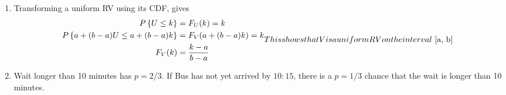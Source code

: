 \begin{enumerate}
\begin{subequations}
\begin{enumerate}
			Applying the above result to the expected value calculation,
			
			\begin{align}
				\mathbb{E}[X] &= \sum\limits_{k = 1}^{\infty} k \ (1-p)^{k-1}\ p \nonumber \\
				&= p\ \left[1 + 2(1-p) + 3(1-p)^2 + 4(1-p)^3 + \dots\right]		\nonumber \\
				&= p \left[\frac{1}{p} + \frac{1-p}{p^2}\right]	= \frac{1}{p} \\
			\end{align}
				
			\item $ Y $ is a negative binomial RV. Only $ r-1 $ out of the first $ k-1 $ trials can be success.
			\begin{align}
				P \left\{Y = k\right\} &= \binom{k-1}{r-1}\ p^{r-1}\ (1-p)^{k-r}\ p \\
			\end{align}
		
			\item Consider $ Y = \sum Y_i $ where the $ Y_i $ are the inter-success intervals. Each of the $ Y_i $ is a geometric RV. Thus,
			\begin{align}
				\mathbb{E}[Y] &= \mathbb{E}\left[\sum\limits_{i = 1}^{r} Y_i\right] \nonumber \\
				&= \sum\limits_{i = 1}^{r} \mathbb{E}[Y_i] = \frac{r}{p}
			\end{align}
			
		\end{enumerate}
	\end{subequations}
	
	
	\item Transforming a uniform RV using its CDF, gives
	\begin{subequations}
		\begin{align}
			P \left\{U \leq k \right\} &= F_U(k) = k \nonumber \\
			P \left\{a + (b-a)U \leq a + (b-a)k \right\} &= F_V (a + (b-a)k) = k \nonumber \\
			F_V(k) &= \frac{k-a}{b-a}
		\end{align}
	
	This shows that V is a uniform RV on the interval $ [a, b] $\\
	\end{subequations} 

	\item Wait longer than 10 minutes has $ p = 2/3 $.
	If Bus has not yet arrived by $ 10:15 $, there is a $ p = 1/3 $ chance that the wait is longer than 10 minutes.
	

\end{enumerate}
